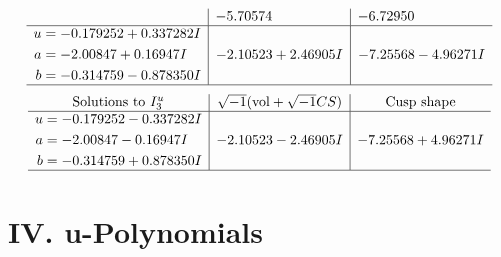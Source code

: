 \documentclass[1p]{elsarticle_modified}
\theoremstyle{definition}
\newcommand{\I}{\sqrt{-1}}
\begin{document}
$$\begin{array}{c|c|c}
 & -5.70574\phantom{ +0.000000I} & -6.72950\phantom{ +0.000000I} \\ \hline\begin{aligned}
u &= -0.179252 + 0.337282 I \\
a &= -2.00847 + 0.16947 I \\
b &= -0.314759 - 0.878350 I\end{aligned}
 & -2.10523 + 2.46905 I & -7.25568 - 4.96271 I\\
 \hline 
 \end{array}$$\newpage$$\begin{array}{c|c|c}  
\text{Solutions to }I^u_{3}& \I (\text{vol} + \sqrt{-1}CS) & \text{Cusp shape}\\
 \hline 
\begin{aligned}
u &= -0.179252 - 0.337282 I \\
a &= -2.00847 - 0.16947 I \\
b &= -0.314759 + 0.878350 I\end{aligned}
 & -2.10523 - 2.46905 I & -7.25568 + 4.96271 I\\
 \hline 
 \end{array}$$\newpage
\newpage\renewcommand{\arraystretch}{1}
\centering \section*{ IV. u-Polynomials}
\end{document}

